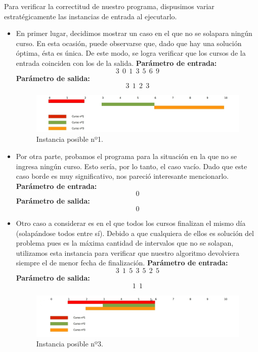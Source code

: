 Para verificar la correctitud de nuestro programa, dispusimos variar estratégicamente las instancias de entrada al ejecutarlo.
\begin{itemize}
\item En primer lugar, decidimos mostrar un caso en el que no se solapara ningún curso. En esta ocasión, puede observarse que, dado que hay una solución óptima, ésta es única. De este modo, se logra verificar que los cursos de la entrada coinciden con los de la salida.\newline
\textbf{Parámetro de entrada:} $$3\ \ 0\ \ 1\ \ 3\ \ 5\ \ 6\ \ 9$$
\textbf{Parámetro de salida:} $$3\ \ 1\ \ 2\ \ 3$$\newline


\begin{figure}[H] %
\begin{center}
\includegraphics[width=450pt]{../imgs/instancia4.jpg}
\end{center}
\caption{Instancia posible nº1.}
\end{figure}

\item Por otra parte, probamos el programa para la situación en la que no se ingresa ningún curso. Esto sería, por lo tanto, el caso vacío. Dado que este caso borde es muy significativo, nos pareció interesante mencionarlo.\newline
\textbf{Parámetro de entrada:} $$0$$
\textbf{Parámetro de salida:} $$0$$ \newline


\item Otro caso a considerar es en el que todos los cursos finalizan el mismo día (solapándose todos entre sí). Debido a que cualquiera de ellos es solución del problema pues es la máxima cantidad de intervalos que no se solapan, utilizamos esta instancia para verificar que nuestro algoritmo devolviera siempre el de menor fecha de finalización. \newline
\textbf{Parámetro de entrada:}  $$3\ \ 1\ \ 5\ \ 3\ \ 5\ \ 2\ \ 5$$
\textbf{Parámetro de salida:}  $$1\ \ 1$$\newline

\begin{figure}[H] %
\begin{center}
\includegraphics[width=450pt]{../imgs/instancia3.jpg}
\end{center}
\caption{Instancia posible nº3.}
\end{figure}



\end{itemize}
